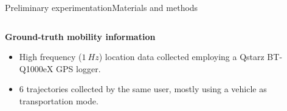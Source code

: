 \begin{frame}{Preliminary experimentation}{Materials and methods}
\small 
\vspace{-0.5cm}
\begin{columns}
\begin{column}[T]{0.55\textwidth}
\begin{block}{\small \textbf{Ground-truth mobility information}}
  \begin{itemize}
    \item High frequency ($1~Hz$) location data collected employing a Qstarz BT-Q1000eX GPS logger.
    \item 6 trajectories collected by the same user, mostly using a vehicle as transportation mode.
  \end{itemize}
\end{block}
\end{column}

\begin{column}[T]{0.45\textwidth}
\begin{table}
\centering
\renewcommand{\arraystretch}{0.6}
\caption{Input parameters for the discovery of ground truth mobility information.}
\label{tab:exp-gt-input-parameters}
\end{table}
\end{column}
\end{columns}

\begin{table}
\centering
\renewcommand{\arraystretch}{0.8}
\end{table}
\end{frame}
